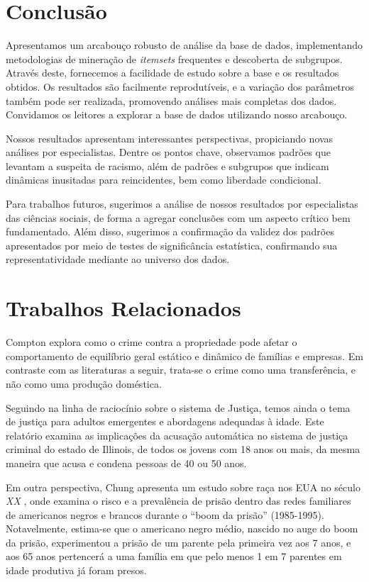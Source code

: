 \documentclass[12pt]{article}
\begin{document}
\section{Conclusão}
Apresentamos um arcabouço robusto de análise da base de dados, implementando metodologias de mineração de \textit{itemsets} frequentes e descoberta de subgrupos. Através deste, fornecemos a facilidade de estudo sobre a base e os resultados obtidos. Os resultados são facilmente reprodutíveis, e a variação dos parâmetros também pode ser realizada, promovendo análises mais completas dos dados. Convidamos os leitores a explorar a base de dados utilizando nosso arcabouço.

Nossos resultados apresentam interessantes perspectivas, propiciando novas análises por especialistas. Dentre os pontos chave, observamos padrões que levantam a suspeita de racismo, além de padrões e subgrupos que indicam dinâmicas inusitadas para reincidentes, bem como liberdade condicional.

Para trabalhos futuros, sugerimos a análise de nossos resultados por especialistas das ciências sociais, de forma a agregar conclusões com um aspecto crítico bem fundamentado. Além disso, sugerimos a confirmação da validez dos padrões apresentados por meio de testes de significância estatística, confirmando sua representatividade mediante ao universo dos dados.

\section{Trabalhos Relacionados}

Compton explora como o crime contra a propriedade pode afetar o comportamento de equilíbrio geral estático e dinâmico de famílias e empresas. \cite{RePEc:pra:mprapa:97002} Em contraste com as literaturas a seguir, trata-se o crime como uma transferência, e não como uma produção doméstica.

Seguindo na linha de raciocínio sobre o sistema de Justiça, temos ainda o tema de justiça para adultos emergentes e abordagens adequadas à idade. \cite{Perker2019EmergingAJ} Este relatório examina as implicações da acusação automática no sistema de justiça criminal do estado de Illinois, de todos os jovens com 18 anos ou mais, da mesma maneira que acusa e condena pessoas de 40 ou 50 anos.

Em outra perspectiva, Chung apresenta um estudo sobre raça nos EUA no século \textit{XX} \cite{raceandfamily}, onde examina o risco e a prevalência de prisão dentro das redes familiares de americanos negros e brancos durante o “boom da prisão” (1985-1995). Notavelmente, estima-se que o americano negro médio, nascido no auge do boom da prisão, experimentou a prisão de um parente pela primeira vez aos 7 anos, e aos 65 anos pertencerá a uma família em que pelo menos 1 em 7 parentes em idade produtiva já foram presos.
\end{document}
